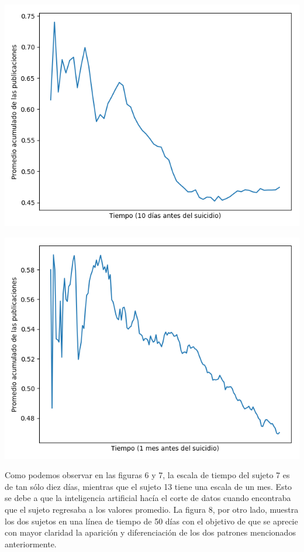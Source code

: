 \documentclass[12pt, man, donotrepeattitle, letterpaper]{apa6}
\begin{document}
    \begin{center}
        \begin{minipage}{0.45\linewidth}
            \includegraphics[width=\linewidth]{images/score_angie}
        \end{minipage}
        \begin{minipage}{0.45\linewidth}
            \includegraphics[width=\linewidth]{images/score_juan}
        \end{minipage}
    \end{center}
    
    Como podemos observar en las figuras 6 y 7, la escala de tiempo del sujeto 7 es de tan sólo diez días, mientras que el sujeto 13 tiene una escala de un mes. Esto se debe a que la inteligencia artificial hacía el corte de datos cuando encontraba que el sujeto regresaba a los valores promedio. La figura 8, por otro lado, muestra los dos sujetos en una línea de tiempo de 50 días con el objetivo de que se aprecie con mayor claridad la aparición y diferenciación de los dos patrones mencionados anteriormente.
    
\end{document}
